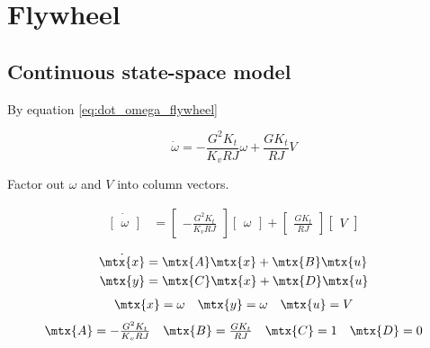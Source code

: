 \section{Flywheel}
\label{sec:ss_model_flywheel}

\subsection{Continuous state-space model}

By equation \eqref{eq:dot_omega_flywheel}

\begin{equation*}
  \dot{\omega} = -\frac{G^2 K_t}{K_v RJ} \omega + \frac{G K_t}{RJ} V
\end{equation*}

Factor out $\omega$ and $V$ into column vectors.

\begin{align*}
  \dot{\begin{bmatrix}
    \omega
  \end{bmatrix}} &=
  \begin{bmatrix}
    -\frac{G^2 K_t}{K_v RJ}
  \end{bmatrix}
  \begin{bmatrix}
    \omega
  \end{bmatrix} +
  \begin{bmatrix}
    \frac{GK_t}{RJ}
  \end{bmatrix}
  \begin{bmatrix}
    V
  \end{bmatrix}
\end{align*}

\begin{theorem}
  \begin{align*}
    \dot{\mtx{x}} &= \mtx{A} \mtx{x} + \mtx{B} \mtx{u} \\
    \mtx{y} &= \mtx{C} \mtx{x} + \mtx{D} \mtx{u}
  \end{align*}
  \begin{equation*}
    \begin{array}{ccc}
      \mtx{x} = \omega &
      \mtx{y} = \omega &
      \mtx{u} = V
    \end{array}
  \end{equation*}
  \begin{equation}
    \begin{array}{cccc}
      \mtx{A} = -\frac{G^2 K_t}{K_v RJ} &
      \mtx{B} = \frac{G K_t}{RJ} &
      \mtx{C} = 1 &
      \mtx{D} = 0
    \end{array}
  \end{equation}
\end{theorem}


